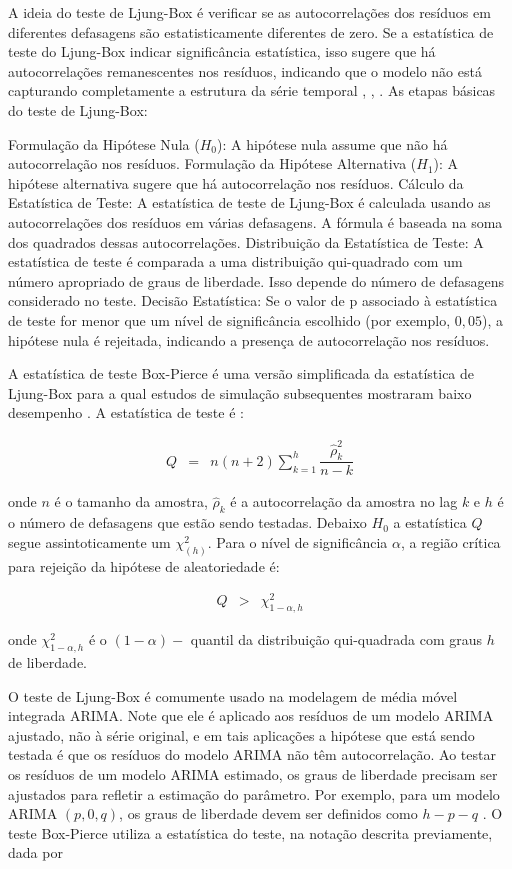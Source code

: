 A ideia do teste de Ljung-Box é verificar se as autocorrelações dos resíduos em diferentes defasagens são estatisticamente diferentes de zero. Se a estatística de teste do Ljung-Box indicar significância estatística, isso sugere que há autocorrelações remanescentes nos resíduos, indicando que o modelo não está capturando completamente a estrutura da série temporal \cite{box}, \cite{ljung}, \cite{dav}. As etapas básicas do teste de Ljung-Box:

Formulação da Hipótese Nula ($H_0$): A hipótese nula assume que não há autocorrelação nos resíduos.
Formulação da Hipótese Alternativa ($H_1$): A hipótese alternativa sugere que há autocorrelação nos resíduos.
Cálculo da Estatística de Teste: A estatística de teste de Ljung-Box é calculada usando as autocorrelações dos resíduos em várias defasagens. A fórmula é baseada na soma dos quadrados dessas autocorrelações.
Distribuição da Estatística de Teste: A estatística de teste é comparada a uma distribuição qui-quadrado com um número apropriado de graus de liberdade. Isso depende do número de defasagens considerado no teste.
Decisão Estatística: Se o valor de p associado à estatística de teste for menor que um nível de significância escolhido (por exemplo, $0,05$), a hipótese nula é rejeitada, indicando a presença de autocorrelação nos resíduos.
 
A estatística de teste Box-Pierce é uma versão simplificada da estatística de Ljung-Box para a qual estudos de simulação subsequentes mostraram baixo desempenho \cite{dav}. A estatística de teste é \cite{ljung}:
 
 \begin{eqnarray}
 	Q&=&n(n+2) \sum_{k=1}^h \dfrac{\hat{\rho}_k^2}{n-k}
 \end{eqnarray}
 
\noindent onde $n$ é o tamanho da amostra, $\hat{\rho}_k$ é a autocorrelação da amostra no lag $k$ e $h$ é o número de defasagens que estão sendo testadas. Debaixo $H_0$ a estatística $Q$ segue assintoticamente um $\chi_{(h)}^2$. Para o nível de significância $\alpha$, a região crítica para rejeição da hipótese de aleatoriedade é:
 
\begin{eqnarray}
 	Q&>&\chi_{1-\alpha, h}^2
\end{eqnarray}
 
\noindent onde $\chi_{1-\alpha, h}^2$ é o $(1-\alpha)-$ quantil \cite{Brockwell2002} da distribuição qui-quadrada com graus $h$ de liberdade.
 
O teste de Ljung-Box é comumente usado na modelagem de média móvel integrada ARIMA. Note que ele é aplicado aos resíduos de um modelo ARIMA ajustado, não à série original, e em tais aplicações a hipótese que está sendo testada é que os resíduos do modelo ARIMA não têm autocorrelação. Ao testar os resíduos de um modelo ARIMA estimado, os graus de liberdade precisam ser ajustados para refletir a estimação do parâmetro. Por exemplo, para um modelo ARIMA $(p,0,q)$, os graus de liberdade devem ser definidos como $h-p-q$ \cite{Davidson2000}. O teste Box-Pierce utiliza a estatística do teste, na notação descrita previamente, dada por \cite{box}
 
